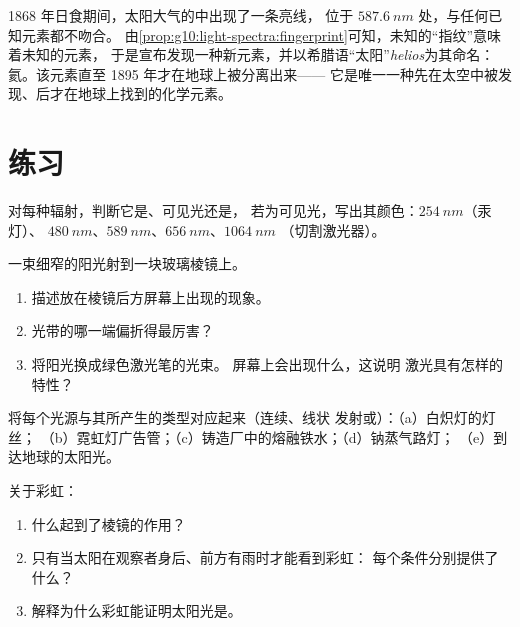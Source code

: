\begin{remark}[首先在天空中发现的元素]\label{rem:g10:light-spectra:helium}
1868 年日食期间，太阳大气的中出现了一条亮线，
位于 $\qty{587.6}{nm}$ 处，与任何已知元素都不吻合。
由\cref{prop:g10:light-spectra:fingerprint}可知，未知的“指纹”意味着未知的元素，
于是宣布发现一种新元素，并以希腊语“太阳”\emph{helios}为其命名：
氦。该元素直至 1895 年才在地球上被分离出来——
它是唯一一种先在太空中被发现、后才在地球上找到的化学元素。
\end{remark}

\section{练习}

\begin{exercise}[$\star$]\label{exo:g10:light-spectra:1}
对每种辐射，判断它是、可见光还是，
若为可见光，写出其颜色：$\qty{254}{nm}$（汞灯）、
$\qty{480}{nm}$、$\qty{589}{nm}$、$\qty{656}{nm}$、$\qty{1064}{nm}$
（切割激光器）。
\end{exercise}

\begin{exercise}[$\star$]\label{exo:g10:light-spectra:2}
一束细窄的阳光射到一块玻璃棱镜上。
\begin{enumerate}
  \item 描述放在棱镜后方屏幕上出现的现象。
  \item 光带的哪一端偏折得最厉害？
  \item 将阳光换成绿色激光笔的光束。
        屏幕上会出现什么，这说明
        激光具有怎样的特性？
\end{enumerate}
\end{exercise}

\begin{exercise}[$\star$]\label{exo:g10:light-spectra:3}
将每个光源与其所产生的类型对应起来（连续、线状
发射或）：（a）白炽灯的灯丝；
（b）霓虹灯广告管；（c）铸造厂中的熔融铁水；（d）钠蒸气路灯；
（e）到达地球的太阳光。
\end{exercise}

\begin{exercise}[$\star$]\label{exo:g10:light-spectra:4}
关于彩虹：
\begin{enumerate}
  \item 什么起到了棱镜的作用？
  \item 只有当太阳在观察者身后、前方有雨时才能看到彩虹：
        每个条件分别提供了什么？
  \item 解释为什么彩虹能证明太阳光是。
\end{enumerate}
\end{exercise}

